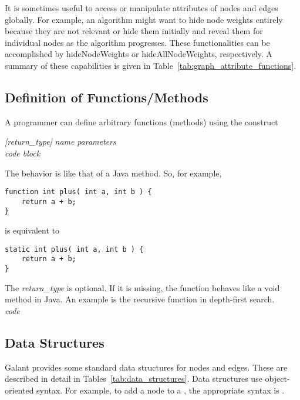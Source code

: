 

It is sometimes useful to access or manipulate attributes of nodes and edges
globally.
For example, an algorithm might want to hide node weights entirely
because they are not relevant
or hide them initially and reveal them for individual nodes as
the algorithm progresses.
These functionalities can be accomplished by
\textsf{hideNodeWeights} or \textsf{hideAllNodeWeights}, respectively.
A summary of these capabilities is given in Table~\ref{tab:graph_attribute_functions}.

\subsection{Definition of Functions/Methods}\label{sec:functions}

A programmer can define arbitrary functions (methods) using the construct

 \textsl{[return\_type]} \textsl{name} \Code{(}
 \textsl{parameters} \Code{) \{} \\
 \hspace*{3em} \emph{code block} \\
 \Code{\}}

The behavior is like that of a Java method. So, for example,
\begin{verbatim}
function int plus( int a, int b ) {
    return a + b;
}
\end{verbatim}
is equivalent to
\begin{verbatim}
static int plus( int a, int b ) {
    return a + b;
}
\end{verbatim}

The \textsl{return\_type} is optional. If it is missing, the function behaves like
a \textsf{void} method in Java. An example is the recursive function
 in depth-first search.
\\
 \textsl{code} \Code{\}}



\subsection{Data Structures} \label{sec:datastructures}

Galant provides some standard data structures for nodes and edges.
These are described in detail in Tables~\ref{tab:data_structures}.
Data structures use object-oriented syntax.
For example, to add a node  to a  ,
the appropriate syntax is .

